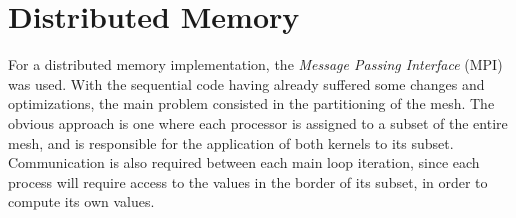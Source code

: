 \section{Distributed Memory}
\label{sec:mpi}


For a distributed memory implementation, the \textit{Message Passing Interface} (MPI) was used.
With the sequential code having already suffered some changes and optimizations, the main problem consisted in the partitioning of the mesh.
The obvious approach is one where each processor is assigned to a subset of the entire mesh, and is responsible for the application of both kernels to its subset.
Communication is also required between each main loop iteration, since each process will require access to the values in the border of its subset, in order to compute its own values.





